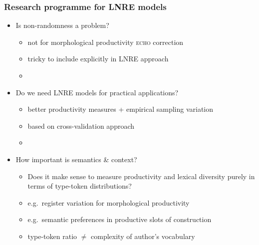 \documentclass[t]{beamer} %
\begin{document}
\begin{frame}[c]
  \frametitle{Research programme for LNRE models}

  \begin{itemize}
  \item Is non-randomness a problem?
    \begin{itemize}
    \item not for morphological productivity \so \textsc{echo} correction
    \item tricky to include explicitly in LNRE approach
    \item[]
    \end{itemize}
  \item Do we need LNRE models for practical applications?
    \begin{itemize}
    \item better productivity measures + empirical sampling variation
    \item based on cross-validation approach \citep{Evert:Wankerl:Noeth:17}
    \item[]
    \end{itemize}
  \item How important is semantics \& context?
    \begin{itemize}
    \item Does it make sense to measure productivity and lexical diversity purely in terms of type-token distributions?
    \item e.g.\ register variation for morphological productivity
    \item e.g.\ semantic preferences in productive slots of construction
    \item type-token ratio $\neq$ complexity of author's vocabulary
    \end{itemize}
  \end{itemize}
\end{frame}

\begin{frame}[c]
  \begin{center}
  \end{center}
\end{frame}



\end{document}
